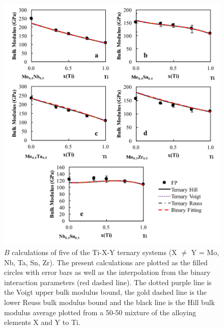 \pagebreak
\begin{figure}[H]
	\centering
	\includegraphics[width=\textwidth]{Chapter-6/Figures/tixybulk1.png}
	\caption{$B$ calculations of five of the Ti-X-Y ternary systems (X $\neq$ Y = Mo, Nb, Ta, Sn, Zr). The present calculations are plotted as the filled circles with error bars as well as the interpolation from the binary interaction parameters (red dashed line). The dotted purple line is the Voigt upper bulk modulus bound, the gold dashed line is the lower Reuss bulk modulus bound and the black line is the Hill bulk modulus average plotted from a 50-50 mixture of the alloying elements X and Y to Ti.}
	\label{Ch6-figure:tixybulk1}
\end{figure}

